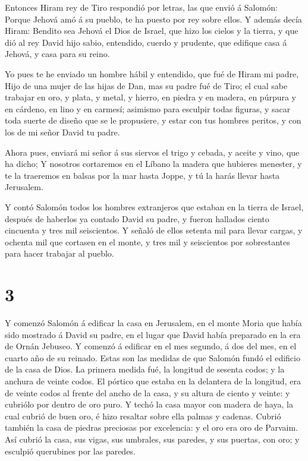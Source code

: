  Entonces Hiram rey de Tiro respondió por letras, las que
envió á Salomón: Porque Jehová amó á su pueblo, te ha puesto por rey
sobre ellos.  Y además decía Hiram: Bendito sea Jehová el
Dios de Israel, que hizo los cielos y la tierra, y que dió al rey David
hijo sabio, entendido, cuerdo y prudente, que edifique casa á Jehová, y
casa para su reino.

 Yo pues te he enviado un hombre hábil y entendido, que fué
de Hiram mi padre,  Hijo de una mujer de las hijas de Dan,
mas su padre fué de Tiro; el cual sabe trabajar en oro, y plata, y
metal, y hierro, en piedra y en madera, en púrpura y en cárdeno, en lino
y en carmesí; asimismo para esculpir todas figuras, y sacar toda suerte
de diseño que se le propusiere, y estar con tus hombres peritos, y con
los de mi señor David tu padre.

 Ahora pues, enviará mi señor á sus siervos el trigo y
cebada, y aceite y vino, que ha dicho;  Y nosotros
cortaremos en el Líbano la madera que hubieres menester, y te la
traeremos en balsas por la mar hasta Joppe, y tú la harás llevar hasta
Jerusalem.

 Y contó Salomón todos los hombres extranjeros que estaban
en la tierra de Israel, después de haberlos ya contado David su padre, y
fueron hallados ciento cincuenta y tres mil seiscientos.  Y
señaló de ellos setenta mil para llevar cargas, y ochenta mil que
cortasen en el monte, y tres mil y seiscientos por sobrestantes para
hacer trabajar al pueblo.

\hypertarget{section-2}{%
\section{3}\label{section-2}}

 Y comenzó Salomón á edificar la casa en Jerusalem, en el
monte Moria que había sido mostrado á David su padre, en el lugar que
David había preparado en la era de Ornán Jebuseo.  Y comenzó
á edificar en el mes segundo, á dos del mes, en el cuarto año de su
reinado.  Estas son las medidas de que Salomón fundó el
edificio de la casa de Dios. La primera medida fué, la longitud de
sesenta codos; y la anchura de veinte codos.  El pórtico que
estaba en la delantera de la longitud, era de veinte codos al frente del
ancho de la casa, y su altura de ciento y veinte: y cubriólo por dentro
de oro puro.  Y techó la casa mayor con madera de haya, la
cual cubrió de buen oro, é hizo resaltar sobre ella palmas y cadenas.
 Cubrió también la casa de piedras preciosas por excelencia:
y el oro era oro de Parvaim.  Así cubrió la casa, sus vigas,
sus umbrales, sus paredes, y sus puertas, con oro; y esculpió querubines
por las paredes.

